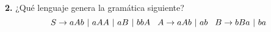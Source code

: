 \textbf{2.} ¿Qué lenguaje genera la gramática siguiente?
\[S \rightarrow aAb\ |\ aAA\ |\ aB\ |\ bbA \hspace*{0.3cm} A \rightarrow aAb\ |\ ab \hspace*{0.3cm} B \rightarrow bBa\ |\ ba\]
